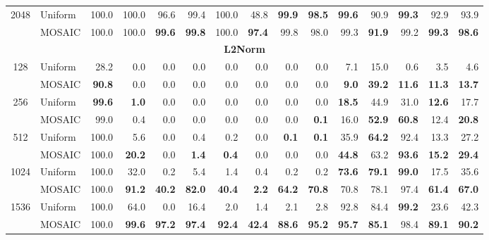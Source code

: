 \begin{table}[tp]
\begin{tabular}{@{} c l rrrrrrrrrrrrr @{}}
    \cmidrule(l){1-15}
    \multirow{2}{*}{2048} & Uniform & 100.0 & 100.0 & 96.6 & 99.4 & 100.0 & 48.8 & \textbf{99.9} & \textbf{98.5} & \textbf{99.6} & 90.9 & \textbf{99.3} & 92.9 & 93.9 \\
     & MOSAIC & 100.0 & 100.0 & \textbf{99.6} & \textbf{99.8} & 100.0 & \textbf{97.4} & 99.8 & 98.0 & 99.3 & \textbf{91.9} & 99.2 & \textbf{99.3} & \textbf{98.6} \\
    \midrule
    \multicolumn{15}{c}{\textbf{L2Norm}} \\
    \midrule
    \multirow{2}{*}{128} & Uniform & 28.2 & 0.0 & 0.0 & 0.0 & 0.0 & 0.0 & 0.0 & 0.0 & 7.1 & 15.0 & 0.6 & 3.5 & 4.6 \\
     & MOSAIC & \textbf{90.8} & 0.0 & 0.0 & 0.0 & 0.0 & 0.0 & 0.0 & 0.0 & \textbf{9.0} & \textbf{39.2} & \textbf{11.6} & \textbf{11.3} & \textbf{13.7} \\
    \cmidrule(l){1-15}
    \multirow{2}{*}{256} & Uniform & \textbf{99.6} & \textbf{1.0} & 0.0 & 0.0 & 0.0 & 0.0 & 0.0 & 0.0 & \textbf{18.5} & 44.9 & 31.0 & \textbf{12.6} & 17.7 \\
     & MOSAIC & 99.0 & 0.4 & 0.0 & 0.0 & 0.0 & 0.0 & 0.0 & \textbf{0.1} & 16.0 & \textbf{52.9} & \textbf{60.8} & 12.4 & \textbf{20.8} \\
    \cmidrule(l){1-15}
    \multirow{2}{*}{512} & Uniform & 100.0 & 5.6 & 0.0 & 0.4 & 0.2 & 0.0 & \textbf{0.1} & \textbf{0.1} & 35.9 & \textbf{64.2} & 92.4 & 13.3 & 27.2 \\
     & MOSAIC & 100.0 & \textbf{20.2} & 0.0 & \textbf{1.4} & \textbf{0.4} & 0.0 & 0.0 & 0.0 & \textbf{44.8} & 63.2 & \textbf{93.6} & \textbf{15.2} & \textbf{29.4} \\
    \cmidrule(l){1-15}
    \multirow{2}{*}{1024} & Uniform & 100.0 & 32.0 & 0.2 & 5.4 & 1.4 & 0.4 & 0.2 & 0.2 & \textbf{73.6} & \textbf{79.1} & \textbf{99.0} & 17.5 & 35.6 \\
     & MOSAIC & 100.0 & \textbf{91.2} & \textbf{40.2} & \textbf{82.0} & \textbf{40.4} & \textbf{2.2} & \textbf{64.2} & \textbf{70.8} & 70.8 & 78.1 & 97.4 & \textbf{61.4} & \textbf{67.0} \\
    \cmidrule(l){1-15}
    \multirow{2}{*}{1536} & Uniform & 100.0 & 64.0 & 0.0 & 16.4 & 2.0 & 1.4 & 2.1 & 2.8 & 92.8 & 84.4 & \textbf{99.2} & 23.6 & 42.3 \\
     & MOSAIC & 100.0 & \textbf{99.6} & \textbf{97.2} & \textbf{97.4} & \textbf{92.4} & \textbf{42.4} & \textbf{88.6} & \textbf{95.2} & \textbf{95.7} & \textbf{85.1} & 98.4 & \textbf{89.1} & \textbf{90.2} \\

\end{tabular}
\end{table}
